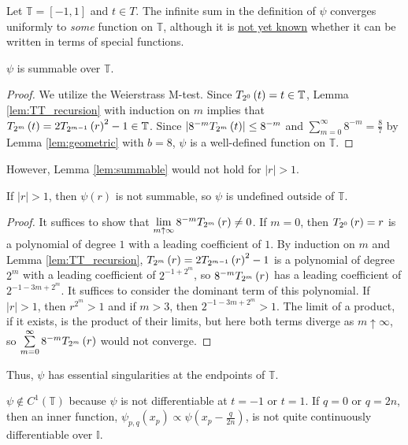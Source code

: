 Let $\mathbb{T} = \left[-1,1\right]$ and $t \in T$. The infinite sum in the definition of $\psi$ converges uniformly to \emph{some} function on $\mathbb{T}$, although it is \underline{not yet known} whether it can be written in terms of special functions. 

\begin{lemma}[]
  \label{lem:summable}
  \leanok
  $\psi$ is summable over $\mathbb{T}$.
\end{lemma}
  
\begin{proof}
  \leanok
  We utilize the Weierstrass M-test. Since $T_{2^{0}}\left(t\right) = t \in \mathbb{T}$, Lemma \ref{lem:TT_recursion} with induction on $m$ implies that $T_{2^{m}}\left(t\right) = 2T_{2^{m - 1}}\left(r\right)^2 - 1 \in \mathbb{T}$. Since $\left|8^{-m} T_{2^{m}}\left(t\right)\right| \leq 8^{-m}$ and $\sum\limits_{m = 0}^\infty 8^{-m} = \frac{8}{7}$ by Lemma \ref{lem:geometric} with $b = 8$, $\psi$ is a well-defined function on $\mathbb{T}$.
\end{proof}
\noindent However, Lemma \ref{lem:summable} would not hold for $\left|r\right| > 1$.
\begin{lemma}[]
  \label{lem:not_summable}
If $\left|r\right| > 1$, then $\psi\left(r\right)$ is not summable, so $\psi$ is undefined outside of $\mathbb{T}$.
\end{lemma}

\begin{proof}
It suffices to show that $\lim\limits_{m \uparrow \infty} 8^{-m} T_{2^{m}}\left(r\right) \neq 0$. If $m = 0$, then $T_{2^{0}}\left(r\right) = r$ is a polynomial of degree $1$ with a leading coefficient of $1$. By induction on $m$ and Lemma \ref{lem:TT_recursion}, $T_{2^{m}}\left(r\right) = 2 T_{2^{m - 1}}\left(r\right)^2 - 1$ is a polynomial of degree $2^m$ with a leading coefficient of $2^{-1 + 2^m}$, so $8^{-m} T_{2^{m}}\left(r\right)$ has a leading coefficient of $2^{-1 - 3m + 2^m}$. It suffices to consider the dominant term of this polynomial. If $\left|r\right| > 1$, then $r^{2^m} > 1$ and if $m > 3$, then $2^{-1 - 3m + 2^m} > 1$. The limit of a product, if it exists, is the product of their limits, but here both terms diverge as $m \uparrow \infty$, so $\sum\limits_{m = 0}^\infty 8^{-m}T_{2^{m}}\left(r\right)$ would not converge.
\end{proof}

Thus, $\psi$ has essential singularities at the endpoints of $\mathbb{T}$.
\begin{proposition}[]
  \label{prop:nondifferentiable}
  $\psi \notin C^1\left(\mathbb{T}\right)$ because $\psi$ is not differentiable at $t = -1$ or $t = 1$. If $q = 0$ or $q = 2n$, then an inner function, $\psi_{p,q}\left(x_p\right) \propto \psi\left(x_p - \frac{q}{2n}\right)$, is not quite continuously differentiable over $\mathbb{I}$. 
\end{proposition}
  
